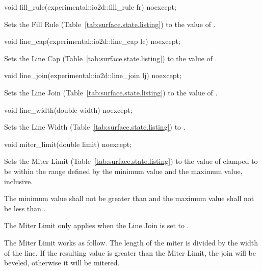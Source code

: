 \begin{itemdecl}
void fill_rule(experimental::io2d::fill_rule fr) noexcept;
\end{itemdecl}
\begin{itemdescr}
\pnum
\effects
Sets the Fill Rule (Table~\ref{tab:surface.state.listing}) to the value of .
\end{itemdescr}

\begin{itemdecl}
void line_cap(experimental::io2d::line_cap lc) noexcept;
\end{itemdecl}
\begin{itemdescr}
\pnum
\effects
Sets the Line Cap (Table~\ref{tab:surface.state.listing}) to the value of .
\end{itemdescr}

\begin{itemdecl}
void line_join(experimental::io2d::line_join lj) noexcept;
\end{itemdecl}
\begin{itemdescr}
\pnum
\effects
Sets the Line Join (Table~\ref{tab:surface.state.listing}) to the value of .
\end{itemdescr}

\begin{itemdecl}
void line_width(double width) noexcept;
\end{itemdecl}
\begin{itemdescr}
\pnum
\effects
Sets the Line Width (Table~\ref{tab:surface.state.listing}) to .
\end{itemdescr}

\begin{itemdecl}
void miter_limit(double limit) noexcept;
\end{itemdecl}
\begin{itemdescr}
\pnum
\effects
Sets the Miter Limit (Table~\ref{tab:surface.state.listing}) to the value of  clamped to be within the range defined by the  minimum value and the  maximum value, inclusive.

\pnum
\remarks
The \impdef minimum value shall not be greater than  and the \impdef maximum value shall not be less than .

\pnum
\realnotes
The Miter Limit only applies when the Line Join is set to .
\exitnote

\pnum
\remarks
The Miter Limit works as follow. The length of the miter is divided by the width of the line. If the resulting value is greater than the Miter Limit, the join will be beveled, otherwise it will be mitered.
\end{itemdescr}

